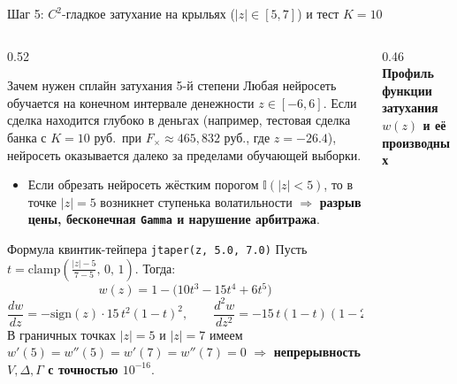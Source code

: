 \documentclass[aspectratio=169, 9pt]{beamer}
\begin{document}
\begin{frame}{Шаг 5: $C^2$-гладкое затухание на крыльях ($|z| \in [5, 7]$) и тест $K = 10$}
  \begin{columns}[T]
    \begin{column}{0.52\textwidth}
      \begin{block}{Зачем нужен сплайн затухания 5-й степени}
        Любая нейросеть обучается на конечном интервале денежности $z \in [-6, 6]$. Если сделка находится глубоко в деньгах (например, тестовая сделка банка с $K = 10$ руб.\ при $F_\times \approx 465,832$ руб., где $z = -26.4$), нейросеть оказывается далеко за пределами обучающей выборки.
        \begin{itemize}
          \item Если обрезать нейросеть жёстким порогом $\mathbb{I}(|z| < 5)$, то в точке $|z| = 5$ возникнет ступенька волатильности $\Rightarrow$ \textbf{разрыв цены, бесконечная \texttt{Gamma} и нарушение арбитража}.
        \end{itemize}
      \end{block}

      \begin{exampleblock}{Формула квинтик-тейпера \texttt{jtaper(z, 5.0, 7.0)}}
        Пусть $t = \text{clamp}\!\left(\frac{|z| - 5}{7 - 5},\, 0,\, 1\right)$. Тогда:
        $$w(z) = 1 - \big(10t^3 - 15t^4 + 6t^5\big)$$
        $$\frac{dw}{dz} = -\text{sign}(z)\cdot 15\, t^2 (1 - t)^2, \qquad
          \frac{d^2w}{dz^2} = -15\, t(1 - t)(1 - 2t)$$
        В граничных точках $|z| = 5$ и $|z| = 7$ имеем $w'(5) = w''(5) = w'(7) = w''(7) = 0$ $\Rightarrow$ \textbf{непрерывность $V, \Delta, \Gamma$ с точностью $10^{-16}$}.
      \end{exampleblock}
    \end{column}

    \begin{column}{0.46\textwidth}
      \centering
      \textbf{\scriptsize Профиль функции затухания $w(z)$ и её производных}\\[0.3em]
\end{column}
\end{columns}
\end{frame}
\end{document}
